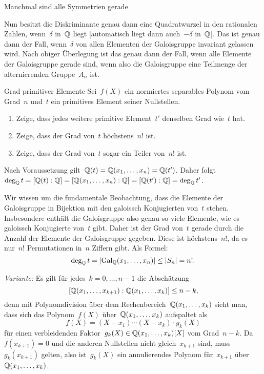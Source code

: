 \documentclass{algblatt}
\begin{document}
\begin{aufgabe}{Manchmal sind alle Symmetrien gerade}
\begin{loesungE}
Nun besitzt die Diskriminante genau dann eine Quadratwurzel in den rationalen
Zahlen, wenn~$\delta$ in~$\mathbb{Q}$ liegt [automatisch liegt dann auch~$-\delta$
in~$\mathbb{Q}$]. Das ist genau dann der Fall, wenn~$\delta$ von allen Elementen der
Galoisgruppe invariant gelassen wird. Nach obiger Überlegung ist das genau dann
der Fall, wenn alle Elemente der Galoisgruppe gerade sind, wenn also die
Galoisgruppe eine Teilmenge der alternierenden Gruppe~$A_n$ ist.
\end{loesungE}
\end{aufgabe}

\begin{aufgabe}{Grad primitiver Elemente}
Sei~$f(X)$ ein normiertes separables Polynom vom Grad~$n$ und~$t$ ein
primitives Element seiner Nullstellen.
\begin{enumerate}
\item Zeige, dass jedes weitere primitive Element~$t'$ denselben Grad wie~$t$
hat.
\item Zeige, dass der Grad von~$t$ höchstens~$n!$ ist.
\item Zeige, dass der Grad von~$t$ sogar ein Teiler von~$n!$ ist.
\end{enumerate}

\begin{loesungE}
\item Nach Voraussetzung gilt~$\mathbb{Q}(t) = \mathbb{Q}(x_1,\ldots,x_n) = \mathbb{Q}(t')$. Daher
folgt $\deg_{\mathbb{Q}} t = [\mathbb{Q}(t):\mathbb{Q}] = [\mathbb{Q}(x_1,\ldots,x_n):\mathbb{Q}] =
[\mathbb{Q}(t'):\mathbb{Q}] = \deg_{\mathbb{Q}} t'$.

\item Wir wissen um die fundamentale Beobachtung, dass die Elemente der
Galoisgruppe in Bijektion mit den galoissch Konjugierten von~$t$ stehen.
Insbesondere enthält die Galoisgruppe also genau so viele Elemente, wie es
galoissch Konjugierte von~$t$ gibt. Daher ist der Grad von~$t$ gerade durch
die Anzahl der Elemente der Galoisgruppe gegeben. Diese ist höchstens~$n!$, da
es nur~$n!$ Permutationen in~$n$ Ziffern gibt. Als Formel:
\[ \deg_{\mathbb{Q}} t = |\mathrm{Gal}_{\mathbb{Q}}(x_1,\ldots,x_n)| \leq |S_n| = n!. \]

\emph{Variante:} Es gilt für jedes~$k = 0,\ldots,n-1$ die Abschätzung
\[ [\mathbb{Q}(x_1,\ldots,x_{k+1}):\mathbb{Q}(x_1,\ldots,x_k)] \leq n - k, \]
denn mit Polynomdivision über dem Rechenbereich~$\mathbb{Q}(x_1,\ldots,x_k)$ sieht
man, dass sich das Polynom~$f(X)$ über~$\mathbb{Q}(x_1,\ldots,x_k)$ aufspaltet als
\[ f(X) = (X-x_1) \cdots (X-x_k) \cdot g_k(X) \]
für einen verbleidenden Faktor~$g_k(X) \in \mathbb{Q}(x_1,\ldots,x_k)[X]$ vom
Grad~$n-k$. Da~$f(x_{k+1}) = 0$ und die anderen Nullstellen nicht gleich~$x_{k+1}$ sind,
muss~$g_k(x_{k+1})$ gelten, also ist~$g_k(X)$ ein annulierendes Polynom
für~$x_{k+1}$ über~$\mathbb{Q}(x_1,\ldots,x_k)$.


\end{loesungE}
\end{aufgabe}
\end{document}
